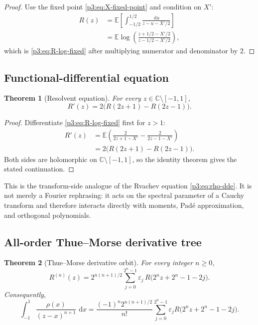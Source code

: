 \documentclass[11pt]{article}
\newtheorem{theorem}{Theorem}[section]
\theoremstyle{definition}
\theoremstyle{remark}
\newcommand{\C}{\mathbb C}
\newcommand{\E}{\mathbb E}
\newcommand{\dd}{\,\mathrm d}
\newcommand{\eps}{\varepsilon}
\begin{document}
\begin{proof}
Use the fixed point \eqref{p3:eq:X-fixed-point} and condition on \(X'\):
\begin{align*}
 R(z)
 &=\E\left[\int_{-1/2}^{1/2}
   \frac{\dd u}{z-u-X'/2}\right]\\
 &=\E\log\!\left(\frac{z+1/2-X'/2}{z-1/2-X'/2}\right),
\end{align*}
which is \eqref{p3:eq:R-log-fixed} after multiplying numerator and denominator by \(2\).
\end{proof}

\subsection{Functional-differential equation}

\begin{theorem}[Resolvent equation]\label{p3:thm:R-dde}
For every \(z\in\C\setminus[-1,1]\),
\begin{equation}
 \boxed{R'(z)=2\bigl(R(2z+1)-R(2z-1)\bigr).}                \label{p3:eq:R-dde}
\end{equation}
\end{theorem}

\begin{proof}
Differentiate \eqref{p3:eq:R-log-fixed} first for \(z>1\):
\begin{align*}
 R'(z)
 &=\E\left(\frac{2}{2z+1-X'}-\frac{2}{2z-1-X'}\right)\\
 &=2\bigl(R(2z+1)-R(2z-1)\bigr).
\end{align*}
Both sides are holomorphic on \(\C\setminus[-1,1]\), so the identity theorem gives the
stated continuation.
\end{proof}

This is the transform-side analogue of the Rvachev equation \eqref{p3:eq:rho-dde}.  It is
not merely a Fourier rephrasing: it acts on the spectral parameter of a Cauchy transform and
therefore interacts directly with moments, Pad\'e approximation, and orthogonal polynomials.

\subsection{All-order Thue--Morse derivative tree}

\begin{theorem}[Thue--Morse derivative orbit]\label{p3:thm:R-derivative-tree}
For every integer \(n\ge0\),
\begin{equation}
 \boxed{
 R^{(n)}(z)=2^{n(n+1)/2}
 \sum_{j=0}^{2^n-1}\eps_j\,
 R\bigl(2^n z+2^n-1-2j\bigr).
 }                                                           \label{p3:eq:R-derivative-tree}
\end{equation}
Consequently,
\begin{equation}
 \int_{-1}^{1}\frac{\rho(x)}{(z-x)^{n+1}}\,\dd x
 =\frac{(-1)^n2^{n(n+1)/2}}{n!}
 \sum_{j=0}^{2^n-1}\eps_j
 R\bigl(2^n z+2^n-1-2j\bigr).                               \label{p3:eq:R-kernel-tree}
\end{equation}
\end{theorem}
\end{document}

